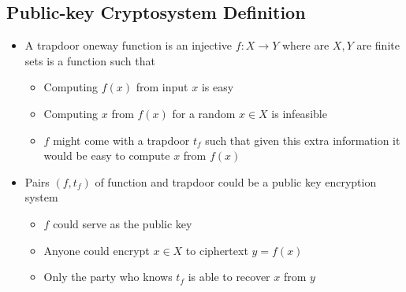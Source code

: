 \subsection{Public-key Cryptosystem Definition}
\begin{itemize}
  \item A trapdoor oneway function is an injective $f: X \to Y$ where are $X,Y$ are finite sets is a function such that
  \begin{itemize}
    \item Computing $f(x)$ from input $x$ is easy
    \item Computing $x$ from $f(x)$ for a random $x \in X$ is infeasible
    \item $f$ might come with a trapdoor $t_f$ such that given this extra information it would be easy to compute $x$ from $f(x)$
  \end{itemize}
  \item Pairs $(f,t_f)$ of function and trapdoor could be a public key encryption system
  \begin{itemize}
    \item $f$ could serve as the public key
    \item Anyone could encrypt $x \in X$ to ciphertext $y = f(x)$
    \item Only the party who knows $t_f$ is able to recover $x$ from $y$
  \end{itemize}


\end{itemize}
